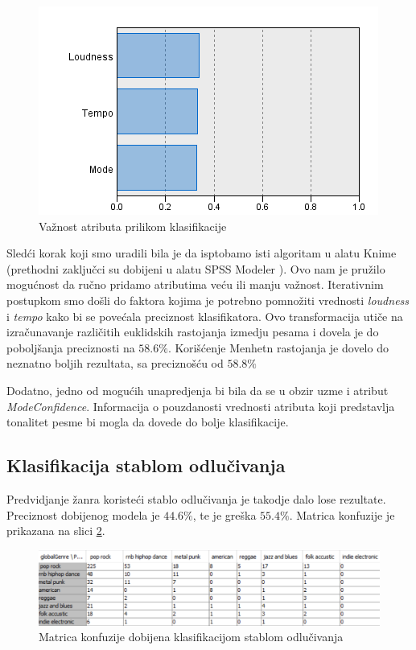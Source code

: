 \begin{figure}[H]
    \centering
    \includegraphics[scale=0.7]{resources/KNN_pred_imp.PNG}
    \caption{Va\v{z}nost atributa prilikom klasifikacije}
    \label{fig:KNNvaznost}
\end{figure}

Sled\'c{}i korak koji smo uradili bila je da isptobamo isti algoritam u alatu Knime \cite{KNIME} (prethodni zaklju\v{c}ci su dobijeni u alatu SPSS Modeler \cite{SPSS}). Ovo nam je pru\v{z}ilo mogu\'c{}nost da ru\v{c}no pridamo atributima ve\'c{}u ili manju va\v{z}nost. Iterativnim postupkom smo do\v{s}li do faktora kojima je potrebno pomno\v{z}iti vrednosti \emph{loudness} i \emph{tempo} kako bi se pove\'c{}ala preciznost klasifikatora. Ovo transformacija uti\v{c}e na izra\v{c}unavanje razli\v{c}itih euklidskih rastojanja izmedju pesama i dovela je do pobolj\v{s}anja preciznosti na $58.6\%$. Kori\v{s}\'c{}enje Menhetn rastojanja je dovelo do neznatno boljih rezultata, sa precizno\v{s}\'c{}u od $58.8\%$

Dodatno, jedno od mogu\'c{}ih unapredjenja bi bila da se u obzir uzme i atribut \emph{ModeConfidence}. Informacija o pouzdanosti vrednosti atributa koji predstavlja tonalitet pesme bi mogla da dovede do bolje klasifikacije.

\subsection{Klasifikacija stablom odlu\v{c}ivanja}
\label{subsec:stablo}
Predvidjanje \v{z}anra koriste\'c{}i stablo odlu\v{c}ivanja je takodje dalo lose rezultate. Preciznost dobijenog modela je $44.6\%$, te je gre\v{s}ka $55.4\%$. Matrica konfuzije je prikazana na slici \ref{fig:confmatrtree}.
\begin{figure}[H]
    \centering
    \includegraphics[scale=0.7]{resources/confmatrix_tree.png}
    \caption{Matrica konfuzije dobijena klasifikacijom stablom odlu\v{c}ivanja}
    \label{fig:confmatrtree}
\end{figure}

